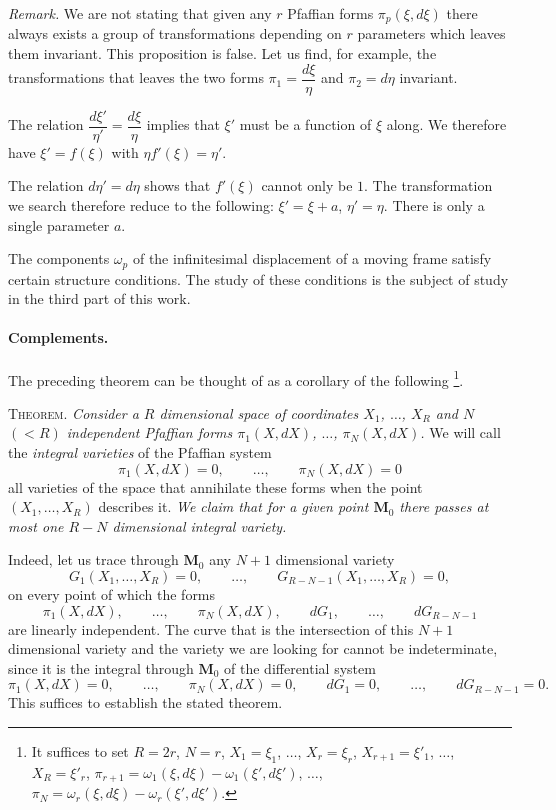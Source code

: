 \documentclass[leqno,11pt]{book}
\numberwithin{equation}{chapter}
\theoremstyle{shape1}
\theoremstyle{shapesmall}
\newcommand{\somespace}{\vspace{9pt}}
\begin{document}
\emph{Remark.} We are not stating that given any $r$ Pfaffian forms $\pi_{p}(\xi,d\xi)$ there always exists a group of transformations depending on $r$ parameters which leaves them invariant. This proposition is false. Let us find, for example, the transformations that leaves the two forms $\pi_{1}=\dfrac{d\xi}{\eta}$ and $\pi_{2}=d\eta$ invariant.

The relation $\dfrac{d\xi'}{\eta'}=\dfrac{d\xi}{\eta}$ implies that $\xi'$ must be a function of $\xi$ along. We therefore have $\xi'=f(\xi)$ with $\eta f'(\xi)=\eta'$.

The relation $d\eta'=d\eta$ shows that $f'(\xi)$ cannot only be $1$. The transformation we search therefore reduce to the following: $\xi'=\xi+a$, $\eta'=\eta$. There is only a single parameter $a$.

The components $\omega_{p}$ of the infinitesimal displacement of a moving frame satisfy certain structure conditions. The study of these conditions is the subject of study in the third part of this work.

\paragraph{Complements.}
\label{sec:84}
The preceding theorem can be thought of as a corollary of the following \footnote{It suffices to set $R=2r$, $N=r$, $X_{1}=\xi_{1}$, $\dots$, $X_{r}=\xi_{r}$, $X_{r+1}=\xi'_{1}$, $\dots$, $X_{R}=\xi'_{r}$, $\pi_{r+1}=\omega_{1}(\xi,d\xi)-\omega_{1}(\xi',d\xi')$, $\dots$, $\pi_{N}=\omega_{r}(\xi,d\xi)-\omega_{r}(\xi',d\xi')$.}.

\somespace

\textsc{Theorem.} \emph{Consider a $R$ dimensional space of coordinates $X_{1}$, $\dots$, $X_{R}$ and $N$ $(<R)$ independent Pfaffian forms $\pi_{1}(X,dX)$, $\dots$, $\pi_{N}(X,dX)$.} We will call the \emph{integral varieties} of the Pfaffian system
\[
\pi_{1}(X,dX)=0,\qquad\dots,\qquad \pi_{N}(X,dX)=0
\]
all varieties of the space that annihilate these forms when the point $(X_{1},\dots,X_{R})$ describes it. \emph{We claim that for a given point $\mathbf{M}_{0}$ there passes at most one $R-N$ dimensional integral variety.}

\somespace

Indeed, let us trace through $\mathbf{M}_{0}$ any $N+1$ dimensional variety
\[
G_{1}(X_{1},\dots,X_{R})=0,\qquad\dots,\qquad G_{R-N-1}(X_{1},\dots,X_{R})=0,
\]
on every point of which the forms
\[
\pi_{1}(X,dX),\qquad\dots,\qquad\pi_{N}(X,dX),\qquad dG_{1},\qquad\dots,\qquad dG_{R-N-1}
\]
are linearly independent. The curve that is the intersection of this $N+1$ dimensional variety and the variety we are looking for cannot be indeterminate, since it is the integral through $\mathbf{M}_{0}$ of the differential system
\[
\pi_{1}(X,dX)=0,\qquad\dots,\qquad\pi_{N}(X,dX)=0,\qquad dG_{1}=0,\qquad\dots,\qquad dG_{R-N-1}=0.
\]
This suffices to establish the stated theorem.
\end{document}

